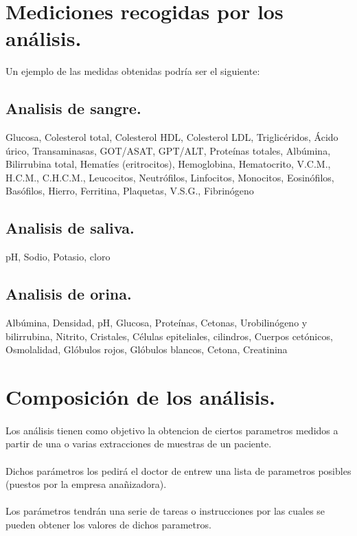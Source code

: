 \documentclass[a4paper,10pt]{article}
\begin{document}
\section{Mediciones recogidas por los análisis.}
Un ejemplo de las medidas obtenidas podría ser el siguiente:
\subsection{Analisis de sangre.}
Glucosa, Colesterol total, Colesterol HDL, Colesterol LDL, Triglicéridos, Ácido úrico, Transaminasas, GOT/ASAT, GPT/ALT, Proteínas totales, Albúmina, Bilirrubina total, Hematíes (eritrocitos), Hemoglobina, Hematocrito, V.C.M., H.C.M., C.H.C.M., Leucocitos, Neutrófilos, Linfocitos, Monocitos, Eosinófilos, Basófilos, Hierro, Ferritina, Plaquetas, V.S.G., Fibrinógeno \subsection{Analisis de saliva.}
pH, Sodio, Potasio, cloro
\subsection{Analisis de orina.}
Albúmina, Densidad, pH, Glucosa, Proteínas, Cetonas, Urobilinógeno y bilirrubina, Nitrito, Cristales, Células epiteliales, cilindros, Cuerpos cetónicos, Osmolalidad, Glóbulos rojos, Glóbulos blancos, Cetona, Creatinina
\pagebreak

\section{Composición de los análisis.}
\paragraph{}
Los análisis tienen como objetivo la obtencion de ciertos parametros medidos a partir de una o varias extracciones de muestras de un paciente.

\paragraph{}
Dichos parámetros los pedirá el doctor de entrew una lista de parametros posibles (puestos por la empresa anañizadora).

\paragraph{}
Los parámetros tendrán una serie de tareas o instrucciones por las cuales se pueden obtener los valores de dichos parametros.
\end{document}
